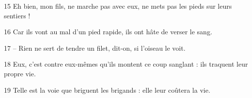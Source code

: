 
15 Eh bien, mon fils, ne marche pas avec eux, ne mets pas les pieds sur leurs sentiers !

16 Car ils vont au mal d’un pied rapide, ils ont hâte de verser le sang.

17 – Rien ne sert de tendre un filet, dit-on, si l’oiseau le voit.

18 Eux, c’est contre eux-mêmes qu’ils montent ce coup sanglant : ils traquent leur propre vie.

19 Telle est la voie que briguent les brigands : elle leur coûtera la vie.